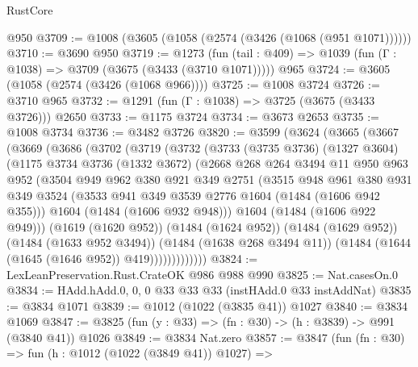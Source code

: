 \begin{lexlean}{RustCore}
\begin{coremodule}
    @950
@3709 := @1008 (@3605 (@1058 (@2574 (@3426 (@1068 (@951 @1071))))))
@3710 := @3690 @950
@3719 := @1273
    (fun (tail : @409) => @1039 (fun (Γ : @1038) => @3709 (@3675 (@3433 (@3710 @1071)))))
    @965
@3724 := @3605 (@1058 (@2574 (@3426 (@1068 @966))))
@3725 := @1008 @3724
@3726 := @3710 @965
@3732 := @1291 (fun (Γ : @1038) => @3725 (@3675 (@3433 @3726))) @2650
@3733 := @1175 @3724
@3734 := @3673 @2653
@3735 := @1008 @3734
@3736 := @3482 @3726
@3820 := @3599
    (@3624
      (@3665
        (@3667
          (@3669
            (@3686
              (@3702
                (@3719
                  (@3732
                    (@3733
                      (@3735 @3736)
                      (@1327 @3604)
                      (@1175
                        @3734
                        @3736
                        (@1332 @3672)
                        (@2668
                          @268
                          @264
                          @3494
                          @11
                          @950
                          @963
                          @952
                          (@3504
                            @949
                            @962
                            @380
                            @921
                            @349
                            @2751
                            (@3515
                              @948
                              @961
                              @380
                              @931
                              @349
                              @3524
                              (@3533 @941 @349 @3539 @2776 @1604 (@1484 (@1606 @942 @355)))
                              @1604
                              (@1484 (@1606 @932 @948)))
                            @1604
                            (@1484 (@1606 @922 @949)))
                          (@1619 (@1620 @952))
                          (@1484 (@1624 @952))
                          (@1484 (@1629 @952))
                          (@1484 (@1633 @952 @3494))
                          (@1484 (@1638 @268 @3494 @11))
                          (@1484 (@1644 (@1645 (@1646 @952)) @419)))))))))))))
@3824 := LexLeanPreservation.Rust.CrateOK @986 @988 @990
@3825 := Nat.casesOn.{0}
@3834 := HAdd.hAdd.{0, 0, 0} @33 @33 @33 (instHAdd.{0} @33 instAddNat)
@3835 := @3834 @1071
@3839 := @1012 (@1022 (@3835 @41)) @1027
@3840 := @3834 @1069
@3847 := @3825 (fun (y : @33) => (fn : @30) -> (h : @3839) -> @991 (@3840 @41)) @1026
@3849 := @3834 Nat.zero
@3857 := @3847
    (fun (fn : @30) =>
    fun (h : @1012 (@1022 (@3849 @41)) @1027) =>

\end{coremodule}
\end{lexlean}
